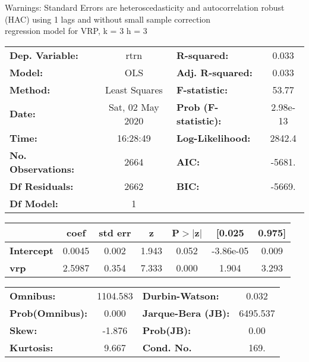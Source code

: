 Warnings: \newline
 [1] Standard Errors are heteroscedasticity and autocorrelation robust (HAC) using 1 lags and without small sample correction\\ 

regression model for VRP, k = 3 h = 3\begin{center}
\begin{tabular}{lclc}
\toprule
\textbf{Dep. Variable:}    &       rtrn       & \textbf{  R-squared:         } &     0.033   \\
\textbf{Model:}            &       OLS        & \textbf{  Adj. R-squared:    } &     0.033   \\
\textbf{Method:}           &  Least Squares   & \textbf{  F-statistic:       } &     53.77   \\
\textbf{Date:}             & Sat, 02 May 2020 & \textbf{  Prob (F-statistic):} &  2.98e-13   \\
\textbf{Time:}             &     16:28:49     & \textbf{  Log-Likelihood:    } &    2842.4   \\
\textbf{No. Observations:} &        2664      & \textbf{  AIC:               } &    -5681.   \\
\textbf{Df Residuals:}     &        2662      & \textbf{  BIC:               } &    -5669.   \\
\textbf{Df Model:}         &           1      & \textbf{                     } &             \\
\bottomrule
\end{tabular}
\begin{tabular}{lcccccc}
                   & \textbf{coef} & \textbf{std err} & \textbf{z} & \textbf{P$> |$z$|$} & \textbf{[0.025} & \textbf{0.975]}  \\
\midrule
\textbf{Intercept} &       0.0045  &        0.002     &     1.943  &         0.052        &    -3.86e-05    &        0.009     \\
\textbf{vrp}       &       2.5987  &        0.354     &     7.333  &         0.000        &        1.904    &        3.293     \\
\bottomrule
\end{tabular}
\begin{tabular}{lclc}
\textbf{Omnibus:}       & 1104.583 & \textbf{  Durbin-Watson:     } &    0.032  \\
\textbf{Prob(Omnibus):} &   0.000  & \textbf{  Jarque-Bera (JB):  } & 6495.537  \\
\textbf{Skew:}          &  -1.876  & \textbf{  Prob(JB):          } &     0.00  \\
\textbf{Kurtosis:}      &   9.667  & \textbf{  Cond. No.          } &     169.  \\
\bottomrule
\end{tabular}
\end{center}

